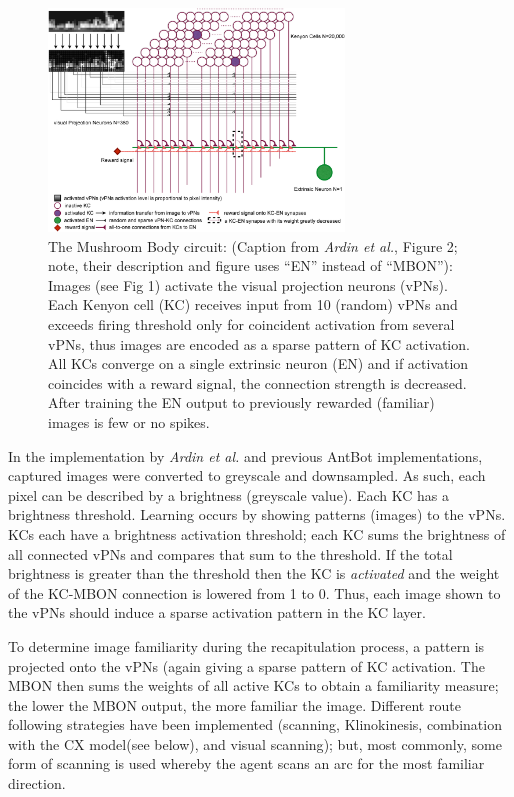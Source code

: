 \documentclass[a4paper,11pt,twoside,openright]{article}
\begin{document}
\begin{figure}
  \centering
  \includegraphics[width=0.7\textwidth]{Ardin2010MBModel}
  \caption{\label{fig:mb} The Mushroom Body circuit: (Caption from
    \textit{Ardin et al.}, Figure 2; note, their description and figure uses
    ``EN'' instead of ``MBON''): Images (see Fig 1) activate the visual
    projection neurons (vPNs). Each Kenyon cell (KC) receives input from 10
    (random) vPNs and exceeds firing threshold only for coincident activation
    from several vPNs, thus images are encoded as a sparse pattern of KC
    activation. All KCs converge on a single extrinsic neuron (EN) and if
    activation coincides with a reward signal, the connection strength is
    decreased. After training the EN output to previously rewarded (familiar)
    images is few or no spikes.}
\end{figure}

In the implementation by \textit{Ardin et al.}
and previous AntBot implementations, captured images were converted to greyscale
and downsampled\cite{Ardin2016, Eberding2016, Zhang2017, Mitchell2018}. As such,
each pixel can be described by a brightness (greyscale value). Each KC has
a brightness threshold. Learning occurs by showing patterns (images) to the vPNs.
KCs each have a brightness activation threshold; each KC sums the brightness of
all connected vPNs and compares that sum to the threshold. If the total
brightness is greater than the threshold then the KC is \textit{activated} and
the weight of the KC-MBON connection is lowered from 1 to 0. Thus, each image
shown to the vPNs should induce a sparse activation pattern in the KC layer.
\newline
\par

To determine image familiarity during the recapitulation process, a pattern is
projected onto the vPNs (again giving a sparse pattern of KC activation.
The MBON then sums the weights of all active KCs to obtain a familiarity measure;
the lower the MBON output, the more familiar the image. Different route following
strategies have been implemented (scanning\cite{Ardin2016, Eberding2016,
  Zhang2017}, Klinokinesis\cite{Zhang2017}, combination with the CX
model\cite{Zhang2017}(see below), and visual scanning\cite{Mitchell2018}); but, most
commonly, some form of scanning is used whereby the agent scans an arc for the
most familiar direction.
\newline
\par
\end{document}
